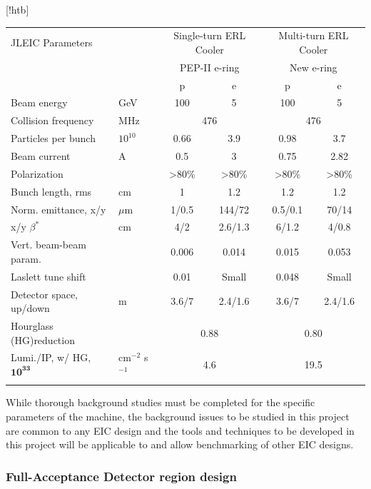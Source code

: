 \begin{center}[!htb]
	\begin{tabular}{ l l c c c c } 
		JLEIC Parameters & & \multicolumn{2}{c}{Single-turn ERL Cooler} & \multicolumn{2}{c}{Multi-turn ERL Cooler}\\ 
		& & \multicolumn{2}{c}{PEP-II e-ring} & \multicolumn{2}{c}{New e-ring} \\
		\hline \hline
		& & p & e & p & e\\
		\hline
		Beam energy & GeV & 100 & 5 &100 &5 \\ 
		Collision frequency & MHz& \multicolumn{2}{c}{476} & \multicolumn{2}{c}{476}\\ 
		Particles per bunch & $10^10$ & 0.66 & 3.9& 0.98 & 3.7\\
		Beam current & A & 0.5 & 3 & 0.75 & 2.82\\
		Polarization &  & \textgreater80\% & \textgreater80\% & \textgreater80\% & \textgreater80\%\\
		Bunch length, rms & cm & 1 & 1.2 & 1.2 & 1.2 \\
		Norm. emittance, x/y& $\mu$m & 1/0.5 & 144/72 & 0.5/0.1 & 70/14 \\
		x/y $\beta^*$ & cm &4/2 & 2.6/1.3 & 6/1.2 & 4/0.8\\
		Vert. beam-beam param.& & 0.006 & 0.014 & 0.015 & 0.053\\
		Laslett tune shift & & 0.01 & Small & 0.048 & Small\\
		Detector space, up/down & m & 3.6/7 & 2.4/1.6 & 3.6/7 & 2.4/1.6\\
		Hourglass (HG)reduction & & \multicolumn{2}{c}{0.88} & \multicolumn{2}{c}{0.80}\\
		Lumi./IP, w/ HG, $\mathbf{10^{33}}$ & cm$^{-2}$ s$^{-1}$ & \multicolumn{2}{c}{4.6} & \multicolumn{2}{c}{19.5} \\
		\hline
		\label{table:parameters}
	\end{tabular}
\end{center}

While thorough background studies must be completed for the specific parameters of the machine, the background issues to be studied in this project are common to any EIC design and the tools and techniques to be developed in this project will be applicable to and allow benchmarking of other EIC designs.

\subsubsection{Full-Acceptance Detector region design}

